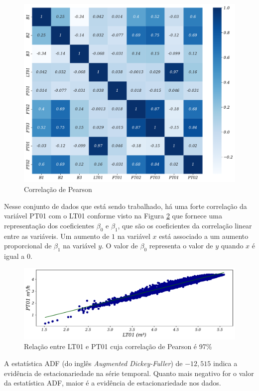 \begin{figure}[!htb]
	\centering
	\caption{Correlação de Pearson}
	\label{fig:person}	\includegraphics[width=0.7\linewidth]{Resultados/Figuras/person}
	
\end{figure}

Nesse conjunto de dados que está sendo trabalhado, há uma forte correlação da variável PT01 com o LT01 conforme visto na Figura \ref{fig:lr-lt01-m3} que fornece uma representação dos coeficientes $\beta_0$ e $\beta_1$, que são os coeficientes da correlação linear entre as variáveis. Um aumento de $1$ na variável $x$ está associado a um aumento proporcional de $\beta_1$ na variável $y$. O valor de $\beta_0$ representa o valor de $y$ quando $x$ é igual a $0$.

\begin{figure}[!htb]
	\centering
	\caption{Relação entre LT01 e PT01 cuja correlação de Pearson é 97\%}
	\label{fig:lr-lt01-m3}
	\includegraphics[width=0.7\linewidth]{Resultados/Figuras/LR}
\end{figure}

A estatística ADF (do inglês \textit{Augmented Dickey-Fuller}) de $-12,515$ indica a evidência de estacionariedade na série temporal. Quanto mais negativo for o valor da estatística ADF, maior é a evidência de estacionariedade nos dados.

